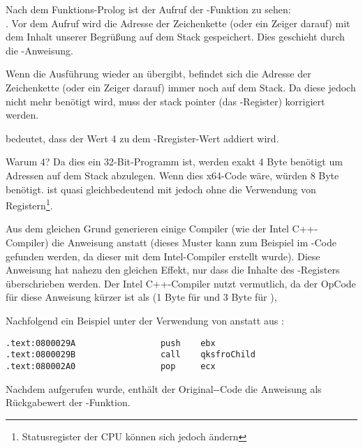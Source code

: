 Nach dem Funktions-Prolog ist der Aufruf der \printf{}-Funktion zu sehen:\\
.
Vor dem Aufruf wird die Adresse der Zeichenkette (oder ein Zeiger darauf) mit dem Inhalt unserer Begrüßung
auf dem Stack gespeichert. Dies geschieht durch die \PUSH-Anweisung.

Wenn \printf die Ausführung wieder an \main übergibt, befindet sich die Adresse der Zeichenkette (oder ein Zeiger darauf) immer noch auf dem Stack.
Da diese jedoch nicht mehr benötigt wird, muss der \gls{stack pointer} (das \ESP-Register) korrigiert werden.

 bedeutet, dass der Wert 4 zu dem \ESP-Rregister-Wert addiert wird.

Warum 4? Da dies ein 32-Bit-Programm ist, werden exakt 4 Byte benötigt um Adressen auf dem Stack abzulegen. Wenn dies x64-Code wäre, würden 8 Byte benötigt.
 ist quasi gleichbedeutend mit  jedoch ohne die Verwendung von Registern\footnote{Statusregister der CPU können sich jedoch ändern}.

\myindex{\oracle}

Aus dem gleichen Grund generieren einige Compiler (wie der Intel C++-Compiler) die Anweisung 
anstatt \ADD (dieses Muster kann zum Beispiel im \oracle{}-Code gefunden werden, da dieser mit dem Intel-Compiler erstellt wurde).
Diese Anweisung hat nahezu den gleichen Effekt, nur dass die Inhalte des \ECX-Registers überschrieben werden.
Der Intel C++-Compiler nutzt  vermutlich, da der OpCode für diese Anweisung kürzer ist als  (1 Byte für  und 3 Byte für ),

Nachfolgend ein Beispiel unter der Verwendung von \POP anstatt \ADD aus \oracle{}:

\begin{lstlisting}[caption=\oracle 10.2 Linux (app.o file)]
.text:0800029A                 push    ebx
.text:0800029B                 call    qksfroChild
.text:080002A0                 pop     ecx
\end{lstlisting}

Nachdem \printf aufgerufen wurde, enthält der Original-\CCpp-Code die Anweisung  als Rückgabewert der \main-Funktion.


